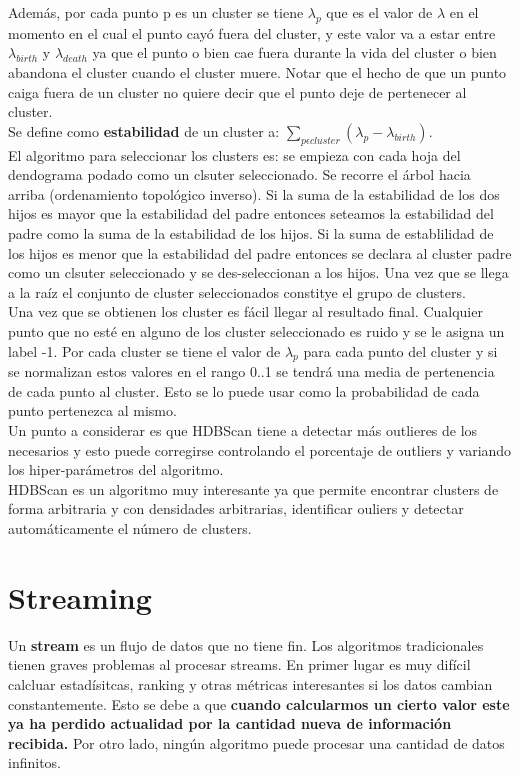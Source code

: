 \documentclass[titlepage,a4paper]{article}
\begin{document}
Además, por cada punto p es un cluster se tiene $\lambda_p$ que es el valor de $\lambda$ en el momento en el cual el punto cayó fuera del cluster, y este valor va a  estar entre $\lambda_{birth}$ y $\lambda_{death}$ ya que el punto o bien cae fuera durante la vida del cluster o bien abandona el cluster cuando el cluster muere. Notar que el hecho de que un punto caiga fuera de un cluster no quiere decir que el punto deje de pertenecer al cluster. \\

Se define como \textbf{estabilidad} de un cluster a: $\sum_{p\epsilon cluster} (\lambda_p - \lambda_{birth})$. \\

El algoritmo para seleccionar los clusters es: se empieza con cada hoja del dendograma podado como un clsuter seleccionado. Se recorre el árbol hacia arriba (ordenamiento topológico  inverso). Si la suma de la estabilidad de los dos hijos es mayor que la estabilidad del padre entonces seteamos la estabilidad del padre como la suma de la estabilidad de los hijos. Si la suma de establilidad de los hijos es menor que la estabilidad del padre entonces se declara al cluster padre como un clsuter seleccionado y se des-seleccionan a los hijos. Una vez que se llega a la raíz el conjunto de cluster  seleccionados constitye el grupo de clusters. \\

Una vez que se obtienen los cluster es  fácil llegar al resultado final. Cualquier punto que no esté en alguno de los cluster seleccionado es ruido y se le asigna un label -1. Por cada cluster se tiene el valor de $\lambda_p$ para cada punto del cluster y si se normalizan estos valores en el rango 0..1 se tendrá una media de pertenencia de cada punto al cluster. Esto se lo puede usar como la probabilidad de cada punto pertenezca al mismo. \\

Un punto a considerar es que HDBScan tiene a detectar más outlieres de los necesarios y esto puede corregirse controlando el porcentaje de outliers y variando los hiper-parámetros del algoritmo. \\

HDBScan es un algoritmo muy interesante ya que permite encontrar clusters de forma arbitraria y con densidades arbitrarias, identificar ouliers y detectar automáticamente el número de clusters.  


\section*{Streaming}
Un \textbf{stream} es un flujo de datos que no tiene fin. Los algoritmos tradicionales tienen graves problemas al procesar streams. En primer lugar es muy difícil calcluar estadísitcas, ranking y otras métricas interesantes si los datos cambian constantemente. Esto se debe a que \textbf{cuando calcularmos un cierto valor este ya ha perdido actualidad por la cantidad nueva de información recibida.} Por otro lado, ningún algoritmo puede procesar una cantidad de datos infinitos.\\
\end{document}
